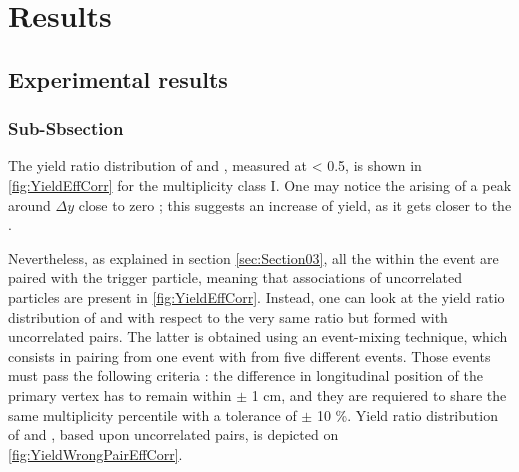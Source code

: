 \newpage
\section{Results}
\label{sec:Section06}

\subsection{Experimental results}
\label{sec:Section06.a-}

\subsubsection{Sub-Sbsection}

The yield ratio distribution of \rmPhiMes and \rmOmegaPM, measured at \absrap < 0.5, is shown in \fig \ref{fig:YieldEffCorr} for the multiplicity class I. One may notice the arising of a peak around $\Delta y$ close to zero ; this suggests an increase of \rmPhiMes yield, as it gets closer to the \rmOmegaPM. 

Nevertheless, as explained in section \ref{sec:Section03}, all the \rmPhiMes within the event are paired with the trigger particle, meaning that associations of uncorrelated particles are present in \fig \ref{fig:YieldEffCorr}. Instead, one can look at the yield ratio distribution of \rmPhiMes and \rmOmegaPM with respect to the very same ratio but formed with uncorrelated pairs. The latter is obtained using an event-mixing technique, which consists in pairing \rmOmegaPM from one event with \rmPhiMes from five different events. Those events must pass the following criteria : the difference in longitudinal position of the primary vertex has to remain within $\pm$ 1 cm, and they are requiered to share the same multiplicity percentile with a tolerance of $\pm$ 10 \%. Yield ratio distribution of \rmPhiMes and \rmOmegaPM, based upon uncorrelated pairs, is depicted on \fig \ref{fig:YieldWrongPairEffCorr}.

